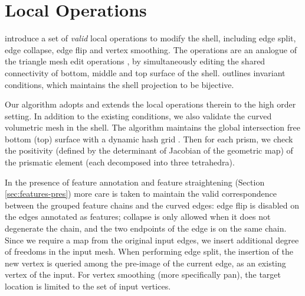 \section{Local Operations}\label{app:local-ops}
\cite[Fig. 11]{jiang2020bijective} introduce a set of \emph{valid} local operations to modify the shell, including edge split, edge collapse, edge flip and vertex smoothing. 
The operations are an analogue of the triangle mesh edit operations \cite{dunyach2013adaptive}, 
by simultaneously editing the shared connectivity of bottom, middle and top surface of the shell.
\cite[Theorem 3.7]{jiang2020bijective} outlines invariant conditions, which maintains the shell projection to be bijective. 

Our algorithm adopts and extends the local operations therein to the high order setting. In addition to the existing conditions, we also validate the curved volumetric mesh in the shell.
The algorithm maintains the global intersection free bottom (top) surface with a dynamic hash grid \cite{teschner2003optimized}. Then for each prism, we check the positivity (defined by the determinant of Jacobian of the geometric map) of the prismatic element (each decomposed into three tetrahedra).

In the presence of feature annotation and feature straightening (Section \ref{sec:features-pres}) more care is taken to maintain the valid correspondence between the grouped feature chains and the curved edges: 
edge flip is disabled on the edges annotated as features; collapse is only allowed when it does not degenerate the chain, and the two endpoints of the edge is on the same chain. 
Since we require a map from the original input edges, we insert additional degree of freedoms in the input mesh. When performing edge split, the insertion of the new vertex is queried among the pre-image of the current edge, as an existing vertex of the input. For vertex smoothing (more specifically pan), the target location is limited to the set of input vertices.



